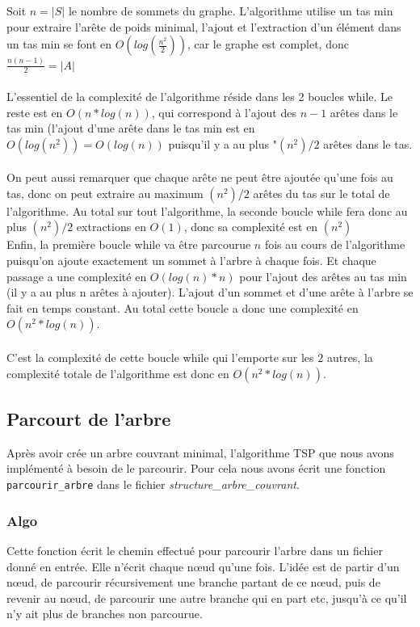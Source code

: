 \documentclass[a4paper,11pt]{article}
\begin{document}
Soit $n=|S|$ le nombre de sommets du graphe.
L'algorithme utilise un tas min pour extraire l'arête de poids minimal, l'ajout et l'extraction d'un élément dans un tas min se font en $O(log(\frac{n^2}{2}))$, car le graphe est complet, donc $\frac{n(n-1)}{2} = |A|$\\
\\
L'essentiel de la complexité de l'algorithme réside dans les 2 boucles while. Le reste est en $O(n*log(n))$, qui correspond à l'ajout des $n-1$ arêtes dans le tas min (l'ajout d'une arête dans le tas min est en $O(log(n^2)) = O(log(n))$ puisqu'il y a au plus "$(n^2)/2$ arêtes dans le tas.\\
\\
On peut aussi remarquer que chaque arête ne peut être ajoutée qu'une fois au tas, donc on peut extraire au maximum $(n^2)/2$ arêtes du tas sur le total de l'algorithme. Au total sur tout l'algorithme, la seconde boucle while fera donc au plus $(n^2)/2$ extractions en $O(1)$, donc sa complexité est en $(n^2)$\\
Enfin, la première boucle while va être parcourue $n$ fois au cours de l'algorithme puisqu'on ajoute exactement un sommet à l'arbre à chaque fois. Et chaque passage a une complexité en $O(log(n)*n)$ pour l'ajout des arêtes au tas min (il y a au plus n arêtes à ajouter). L'ajout d'un sommet et d'une arête à l'arbre se fait en temps constant. Au total cette boucle a donc une complexité en $O(n^2*log(n))$.\\
\\
C'est la complexité de cette boucle while qui l'emporte sur les 2 autres, la complexité totale de l'algorithme est donc en $O(n^2*log(n))$.


\subsection{Parcourt de l'arbre} %

Après avoir crée un arbre couvrant minimal, l'algorithme TSP que nous avons implémenté à besoin de le parcourir. Pour cela nous avons écrit une fonction \texttt{parcourir\_arbre} dans le fichier \textit{structure\_arbre\_couvrant}.

\subsubsection*{Algo}
Cette fonction écrit le chemin effectué pour parcourir l'arbre dans un fichier donné en entrée. Elle n'écrit chaque nœud qu'une fois. L'idée est de partir d'un nœud, de parcourir récursivement une branche partant de ce nœud, puis de revenir au nœud, de parcourir une autre branche qui en part etc, jusqu'à ce qu'il n'y ait plus de branches non parcourue.
\end{document}
